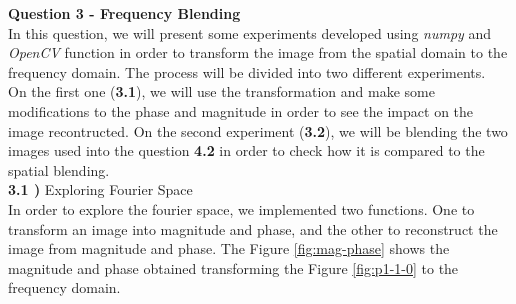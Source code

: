 \documentclass[12pt,a4paper]{article}
\begin{document}
\textbf{\LARGE Question 3 - Frequency Blending} \\

In this question, we will present some experiments developed using \emph{numpy} and \emph{OpenCV} function in order to transform the image from the spatial domain to the frequency domain. The process will be divided into two different experiments. \\

On the first one (\textbf{3.1}), we will use the transformation and make some modifications to the phase and magnitude in order to see the impact on the image recontructed. On the second experiment (\textbf{3.2}), we will be blending the two images used into the question \textbf{4.2} in order to check how it is compared to the spatial blending. \\

\textbf{3.1 )} Exploring Fourier Space \\

In order to explore the fourier space, we implemented two functions. One to transform an image into magnitude and phase, and the other to reconstruct the image from magnitude and phase. The Figure \ref{fig:mag-phase} shows the magnitude and phase obtained transforming the Figure \ref{fig:p1-1-0} to the frequency domain. \\
\end{document}
